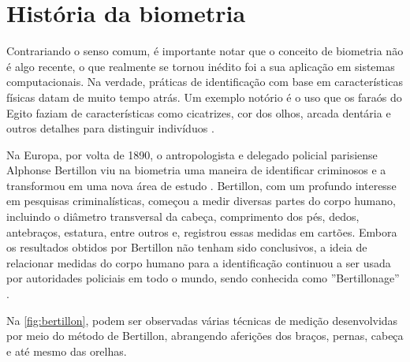 \section{História da biometria}\label{sec:histbiometria}

Contrariando o senso comum, é importante notar que o conceito de biometria 
não é algo recente, o que realmente se tornou inédito foi a sua aplicação 
em sistemas computacionais. Na verdade, práticas de identificação com base 
em características físicas datam de muito tempo atrás. Um exemplo notório 
é o uso que os faraós do Egito faziam de características como cicatrizes, 
cor dos olhos, arcada dentária e outros detalhes para distinguir 
indivíduos \cite[p. 19-25]{boechat2008}.

Na Europa, por volta de 1890, o antropologista e delegado policial 
parisiense Alphonse Bertillon viu na biometria uma maneira de identificar 
criminosos e a transformou em uma nova área de estudo \cite[p. 15]{galimberti2018}. 
Bertillon, com um profundo interesse em pesquisas criminalísticas, 
começou a medir diversas partes do corpo humano, incluindo o diâmetro 
transversal da cabeça, comprimento dos pés, dedos, antebraços, estatura, 
entre outros e, registrou essas medidas em cartões. Embora os resultados 
obtidos por Bertillon não tenham sido conclusivos, a ideia de relacionar 
medidas do corpo humano para a identificação continuou a ser usada 
por autoridades policiais em todo o mundo, sendo conhecida como 
''Bertillonage'' \cite[p. 18]{boechat2008}.

Na \autoref{fig:bertillon}, podem ser observadas várias técnicas de medição 
desenvolvidas por meio do método de Bertillon, abrangendo aferições dos 
braços, pernas, cabeça e até mesmo das orelhas.

